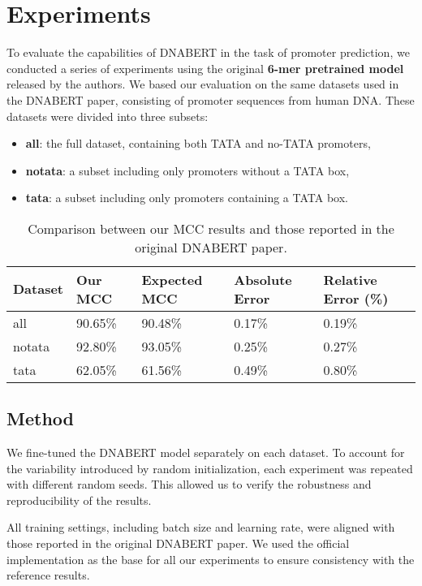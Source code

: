 \section{Experiments}

To evaluate the capabilities of DNABERT in the task of promoter prediction, we conducted a series of experiments using the original \textbf{6-mer pretrained model} released by the authors. We based our evaluation on the same datasets used in the DNABERT paper, consisting of promoter sequences from human DNA. These datasets were divided into three subsets:
\begin{itemize}
\item \textbf{all}: the full dataset, containing both TATA and no-TATA promoters,
\item \textbf{notata}: a subset including only promoters without a TATA box,
\item \textbf{tata}: a subset including only promoters containing a TATA box.
\end{itemize}

\begin{table*}[h]
\centering
\begin{tabular}{|l|l|l|l|l|}
\hline
Dataset & Our MCC & Expected MCC & Absolute Error & Relative Error (\%) \\
\hline
all & 90.65\% & 90.48\% & 0.17\% & 0.19\% \\
notata & 92.80\% & 93.05\% & 0.25\% & 0.27\% \\
tata & 62.05\% & 61.56\% & 0.49\% & 0.80\% \\
\hline
\end{tabular}
\caption{Comparison between our MCC results and those reported in the original DNABERT paper.}
\label{tab:mcc_results}
\end{table*}

\subsection{Method}

We fine-tuned the DNABERT model separately on each dataset. To account for the variability introduced by random initialization, each experiment was repeated with different random seeds. This allowed us to verify the robustness and reproducibility of the results.

All training settings, including batch size and learning rate, were aligned with those reported in the original DNABERT paper. We used the official implementation as the base for all our experiments to ensure consistency with the reference results.

